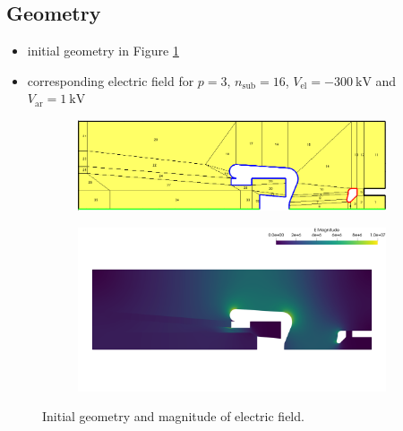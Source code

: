 \subsection{Geometry}
\begin{itemize}
   \item initial geometry in Figure \ref{fig:init}
   \item corresponding electric field for $p=3$, $n_\mathrm{sub}=16$, $V_\mathrm{el}=-300\ \mathrm{kV}$ and $V_\mathrm{ar}=1\ \mathrm{kV}$
\end{itemize}

\begin{center}
\begin{figure}[H]
   \begin{subfigure}{0.45\textwidth}
      \includegraphics[width=\textwidth]{fig/geometry_v6}
   \end{subfigure}
   \begin{subfigure}{0.45\textwidth}
      \includegraphics[width=\textwidth]{fig/E_v6}
   \end{subfigure}
   \caption{Initial geometry and magnitude of electric field.}
   \label{fig:init}
\end{figure}
\end{center}

